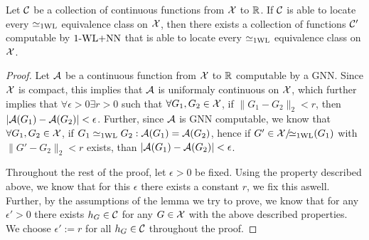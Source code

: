 \begin{lemma}\label{lem:continuous_proof2}
    Let $\mathcal{C}$ be a collection of continuous functions from $\mathcal{X}$ to $\mathbb{R}$. If $\mathcal{C}$ is able to locate every $\simeq_{\text{1WL}}$ equivalence class on $\mathcal{X}$, then there exists a collection of functions $\mathcal{C}'$ computable by $\text{1-WL+NN}$ that is able to locate every $\simeq_{\text{1WL}}$ equivalence class on $\mathcal{X}$.
\end{lemma}

\begin{proof}
    Let $\mathcal{A}$ be a continuous function from $\mathcal{X}$ to $\mathbb{R}$ computable by a GNN. Since $\mathcal{X}$ is compact, this implies that $\mathcal{A}$ is uniformaly continuous on $\mathcal{X}$, which further implies that $\forall \epsilon > 0 \exists r > 0$ such that $\forall G_1, G_2 \in \mathcal{X}$, if $\| G_1 - G_2 \|_2 < r$, then $|\mathcal{A}(G_1) - \mathcal{A}(G_2)| < \epsilon$. Further, since $\mathcal{A}$ is GNN computable, we know that $\forall G_1, G_2 \in \mathcal{X}$, if $G_1 \simeq_{\text{1WL}} G_2: \mathcal{A}(G_1) = \mathcal{A}(G_2)$, hence if $G' \in \mathcal{X}/\!{\simeq_{\text{1WL}}}(G_1)$ with $\| G' - G_2 \|_2 < r$ exists, than $|\mathcal{A}(G_1) - \mathcal{A}(G_2)| < \epsilon$.\newline

    Throughout the rest of the proof, let $\epsilon > 0$ be fixed. Using the property described above, we know that for this $\epsilon$ there exists a constant $r$, we fix this aswell. Further, by the assumptions of the lemma we try to prove, we know that for any $\epsilon' > 0$ there exists $h_{G} \in \mathcal{C}$ for any $G \in \mathcal{X}$ with the above described properties. We choose $\epsilon' := r$ for all $h_{G} \in \mathcal{C}$ throughout the proof.\newline


\end{proof}
